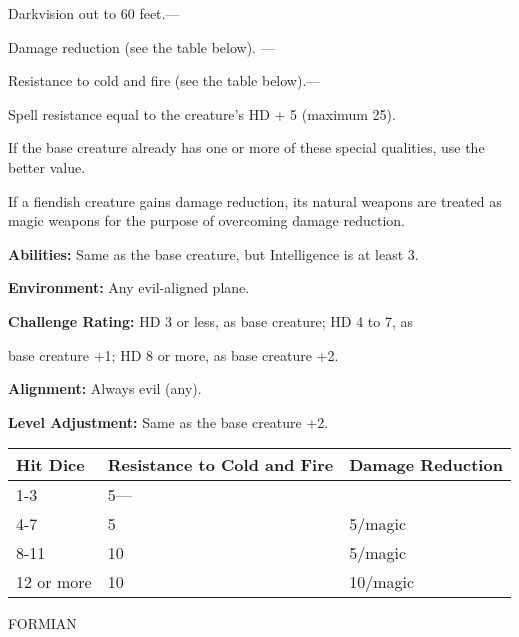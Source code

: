 \documentclass{article}
\begin{document}
Darkvision out to 60 feet.---

Damage reduction (see the table below). ---

Resistance to cold and fire (see the table below).---

Spell resistance equal to the creature's HD + 5 (maximum 25).

If the base creature already has one or more of these special qualities, use the 
better value.

If a fiendish creature gains damage reduction, its natural weapons are treated 
as magic weapons for the purpose of overcoming damage reduction.

\textbf{Abilities:} Same as the base creature, but Intelligence is at least 3.

\textbf{Environment:} Any evil-aligned plane.

\textbf{Challenge Rating:} HD 3 or less, as base creature; HD 4 to 7, as

base creature +1; HD 8 or more, as base creature +2.

\textbf{Alignment: }Always evil (any).

\textbf{Level Adjustment:} Same as the base creature +2.

\begin{tabular}{|>{\raggedright}p{42pt}|>{\raggedright}p{60pt}|>{\raggedright}p{51pt}|}
\hline
H\textbf{it Dice} & R\textbf{esistance to Cold and Fire} & D\textbf{amage Reduction}\tabularnewline
\hline
1-3 & 5--- & \tabularnewline
\hline
4-7 & 5 & 5/magic\tabularnewline
\hline
8-11 & 10 & 5/magic\tabularnewline
\hline
12 or more & 10 & 10/magic\tabularnewline
\hline
\end{tabular}

\vspace{12pt}
{\LARGE{}FORMIAN}
\end{document}
